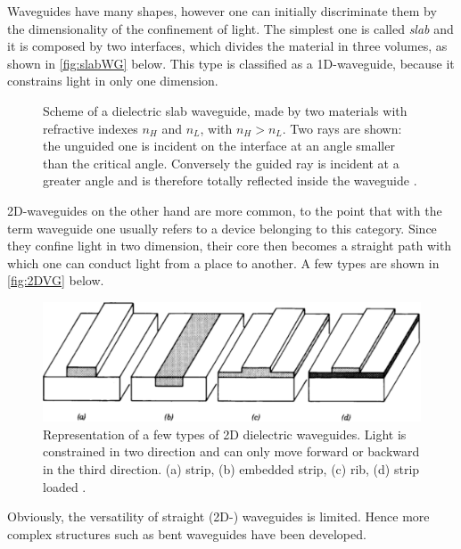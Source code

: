 Waveguides have many shapes, however one can initially discriminate them by the dimensionality of the confinement of light.
The simplest one is called \textit{slab} and it is composed by two interfaces, which divides the material in three volumes, as shown in \autoref{fig:slabWG} below.
This type is classified as a 1D-waveguide, because it constrains light in only one dimension.

\begin{figure}[ht]
	\centering
	
	\caption{Scheme of a dielectric slab waveguide, made by two materials with refractive indexes $n_H$ and $n_L$, with $n_H>n_L$.
		Two rays are shown: the unguided one is incident on the interface at an angle smaller than the critical angle.
		Conversely the guided ray is incident at a greater angle and is therefore totally reflected inside the waveguide \cite{Saleh1991}.}
	\label{fig:slabWG}
\end{figure}

2D-waveguides on the other hand are more common, to the point that with the term waveguide one usually refers to a device belonging to this category.
Since they confine light in two dimension, their core then becomes a straight path with which one can conduct light from a place to another.
A few types are shown in \autoref{fig:2DVG} below.

\begin{figure}[ht]
	\centering
	\includegraphics[scale=.4]{figures/WGtypes.pdf}
	\caption{Representation of a few types of 2D dielectric waveguides.
		Light is constrained in two direction and can only move forward or backward in the third direction.
		(a) strip, (b) embedded strip, (c) rib, (d) strip loaded \cite{Saleh1991}.
		}
	\label{fig:2DVG}
\end{figure}

Obviously, the versatility of straight (2D-) waveguides is limited.
Hence more complex structures such as bent waveguides have been developed.

